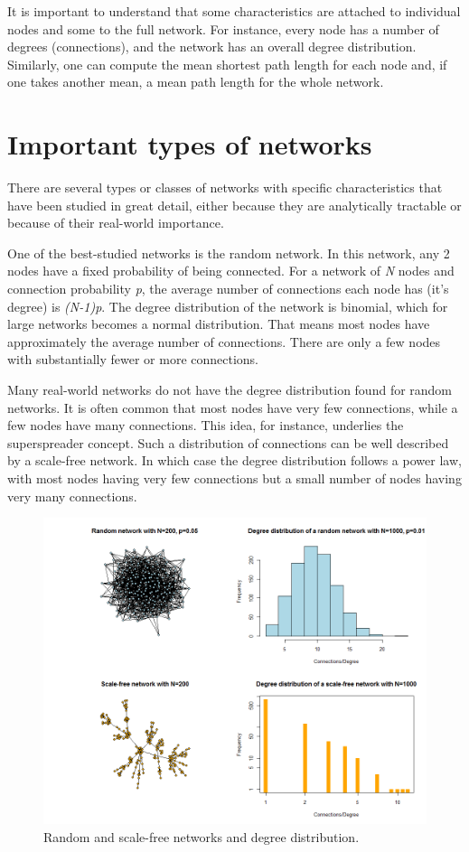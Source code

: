\documentclass[]{book}
\theoremstyle{definition}
\theoremstyle{definition}
\theoremstyle{definition}
\theoremstyle{remark}
\begin{document}
It is important to understand that some characteristics are attached to
individual nodes and some to the full network. For instance, every node
has a number of degrees (connections), and the network has an overall
degree distribution. Similarly, one can compute the mean shortest path
length for each node and, if one takes another mean, a mean path length
for the whole network.

\section{Important types of networks}\label{important-types-of-networks}

There are several types or classes of networks with specific
characteristics that have been studied in great detail, either because
they are analytically tractable or because of their real-world
importance.

One of the best-studied networks is the random network. In this network,
any 2 nodes have a fixed probability of being connected. For a network
of \emph{N} nodes and connection probability \emph{p}, the average
number of connections each node has (it's degree) is \emph{(N-1)p}. The
degree distribution of the network is binomial, which for large networks
becomes a normal distribution. That means most nodes have approximately
the average number of connections. There are only a few nodes with
substantially fewer or more connections.

Many real-world networks do not have the degree distribution found for
random networks. It is often common that most nodes have very few
connections, while a few nodes have many connections. This idea, for
instance, underlies the superspreader concept. Such a distribution of
connections can be well described by a scale-free network. In which case
the degree distribution follows a power law, with most nodes having very
few connections but a small number of nodes having very many
connections.

\begin{figure}
\centering
\includegraphics{./images/network-examples.png}
\caption{\label{fig:network-examples}Random and scale-free networks and
degree distribution.}
\end{figure}
\end{document}
